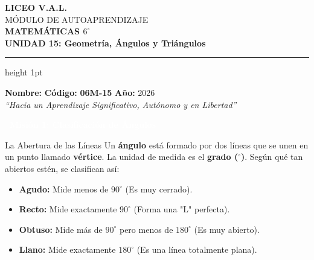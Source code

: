 \documentclass[12pt, letterpaper]{article}
\newcommand{\mision}[1]{
	\vspace{0.6cm}
	\begin{tcolorbox}[
		enhanced, colback=valdark, colframe=valdark, arc=2mm, boxrule=0pt,
		halign=center, valign=center, top=3mm, bottom=3mm, left=2mm, right=2mm,
		drop shadow=valdark!50
		]
		\textcolor{white}{\Large \textbf{\ding{118}\ #1}}
	\end{tcolorbox}
	\vspace{0.3cm}
}
\begin{document}
	
	\begin{flushright}
		{\LARGE \textbf{\textcolor{valblue}{LICEO V.A.L.}}}\\[0.1cm]
		{\large MÓDULO DE AUTOAPRENDIZAJE}\\[0.1cm]
		\textbf{MATEMÁTICAS $6^{\circ}$}\\[0.1cm]
		\textbf{\textcolor{valorange}{UNIDAD 15: Geometría, Ángulos y Triángulos}}
	\end{flushright}
	
	\vspace{0.2cm}
	\hrule height 1pt
	\vspace{0.3cm}
	
	\noindent
	\textbf{Nombre:} \underline{\hspace{7cm}} \hfill \textbf{Código:} \textbf{06M-15} \quad \textbf{Año:} 2026\\[0.1cm]
	\textit{``Hacia un Aprendizaje Significativo, Autónomo y en Libertad''}
	
	\mision{Misión 1: Clasificación de Ángulos}
	
	\begin{conceptbox}{La Abertura de las Líneas}
		Un \textbf{ángulo} está formado por dos líneas que se unen en un punto llamado \textbf{vértice}. La unidad de medida es el \textbf{grado ($^\circ$)}. Según qué tan abiertos estén, se clasifican así:
		\begin{itemize}[itemsep=0.1cm]
			\item \textbf{Agudo:} Mide menos de $90^\circ$ (Es muy cerrado).
			\item \textbf{Recto:} Mide exactamente $90^\circ$ (Forma una "L" perfecta).
			\item \textbf{Obtuso:} Mide más de $90^\circ$ pero menos de $180^\circ$ (Es muy abierto).
			\item \textbf{Llano:} Mide exactamente $180^\circ$ (Es una línea totalmente plana).
		\end{itemize}
	\end{conceptbox}
	
\end{document}
